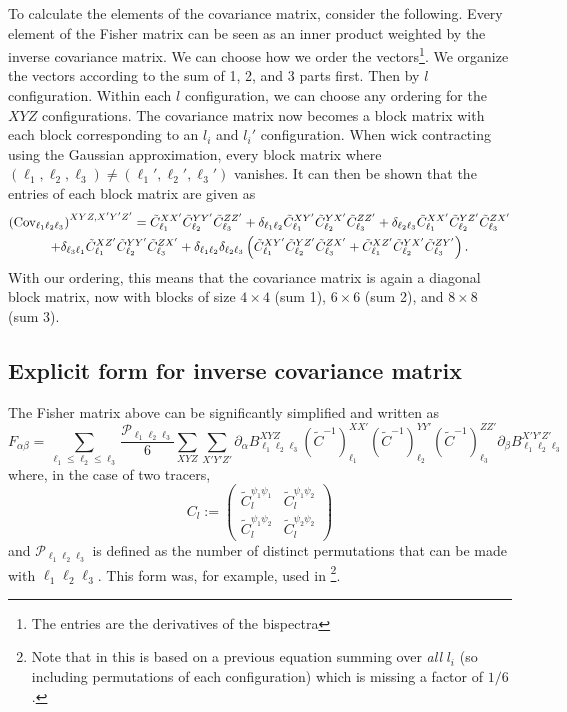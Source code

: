 \documentclass[11pt]{article} %
\DeclareRobustCommand{\Cov}{\ifmmode\text{Cov}\else d\fi}
\newcommand{\br}[1]{\ensuremath{\left( #1 \right)}}
\begin{document}
To calculate the elements of the covariance matrix, consider the following. Every element of the Fisher matrix can be seen as an inner product weighted by the inverse covariance matrix. We can choose how we order the vectors\footnote{The entries are the derivatives of the bispectra}. We organize the vectors according to the sum of 1, 2, and 3 parts first. Then by $l$ configuration. Within each $l$ configuration, we can choose any ordering for the $XYZ$ configurations. The covariance matrix now becomes a block matrix with each block corresponding to an $l_i$ and $l_i'$ configuration. When wick contracting using the Gaussian approximation, every block matrix where $(\ell_1,\ell_2,\ell_3)\neq (\ell_1',\ell_2',\ell_3')$ vanishes. It can then be shown that the entries of each block matrix are given as
\begin{gather*}
    \br{\Cov_{\ell_1\ell_2\ell_3}}^{XYZ,X'Y'Z'} = \tilde C^{XX'}_{\ell_1}\tilde C^{YY'}_{\ell_2}\tilde C^{ZZ'}_{\ell_3} + \delta_{\ell_1\ell_2}\tilde C^{XY'}_{\ell_1}\tilde C^{YX'}_{\ell_2}\tilde C^{ZZ'}_{\ell_3} +\delta_{\ell_2\ell_3}\tilde C^{XX'}_{\ell_1}\tilde C^{YZ'}_{\ell_2}\tilde C^{ZX'}_{\ell_3} \\ + \delta_{\ell_3\ell_1}\tilde C^{XZ'}_{\ell_1}\tilde C^{YY'}_{\ell_2}\tilde C^{ZX'}_{\ell_3} +\delta_{\ell_1\ell_2}\delta_{\ell_2\ell_3}\br{\tilde C^{XY'}_{\ell_1}\tilde C^{YZ'}_{\ell_2}\tilde C^{ZX'}_{\ell_3} +\tilde C^{XZ'}_{\ell_1}\tilde C^{YX'}_{\ell_2}\tilde C^{ZY'}_{\ell_3}}.
\end{gather*}
With our ordering, this means that the covariance matrix is again a diagonal block matrix, now with blocks of size $4 \times 4$ (sum 1), $6 \times 6$ (sum 2), and $8 \times 8$ (sum 3).

\subsection{Explicit form for inverse covariance matrix}
The Fisher matrix above can be significantly simplified and written as
\begin{equation*}
F_{\alpha\beta} = \sum_{\ell_1 \leq \ell_2 \leq \ell_3} \frac{\mathcal P _{\ell_1\ell_2\ell_3}}{6}
\sum_{XYZ}\sum_{X'Y'Z'} 
\partial_\alpha B^{X Y Z}_{\ell_1 \ell_2 \ell_3} 
(\tilde C^{-1})^{X X'}_{\ell_1}
(\tilde C^{-1})^{Y Y'}_{\ell_2}
(\tilde C^{-1})^{Z Z'}_{\ell_3}
\partial_\beta B^{X' Y' Z'}_{\ell_1 \ell_2 \ell_3}
\end{equation*}
where, in the case of two tracers, 
\begin{equation*}
    C_{l} := \begin{pmatrix}
        \tilde C^{\psi_1\psi_1}_l & \tilde C^{\psi_1\psi_2}_l \\
        \tilde C^{\psi_1\psi_2}_l & \tilde C^{\psi_2\psi_2}_l
    \end{pmatrix}
\end{equation*}
and $\mathcal P_{\ell_1\ell_2\ell_3}$ is defined as the number of distinct permutations that can be made with $\ell_1\ell_2\ell_3$. This form was, for example, used in \cite{Kalaja_2021}\footnote{Note that in \cite{Kalaja_2021} this is based on a previous equation summing over \textit{all} $l_i$ (so including permutations of each configuration) which is missing a factor of $1/6$.}.
\end{document}
